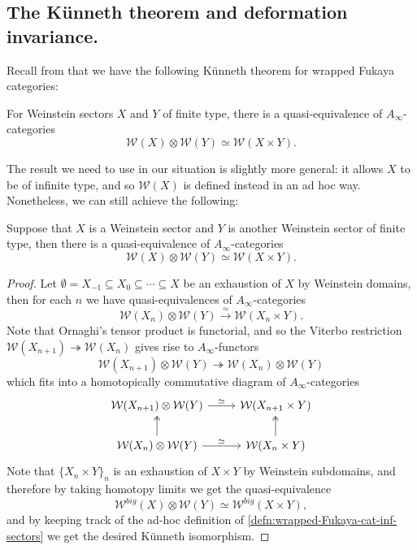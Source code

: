 \subsection{The K\"unneth theorem and deformation invariance.} Recall from \cite{GPS24S} that we have the following K\"unneth theorem for wrapped Fukaya categories:
\begin{thm}\label{thm:Kunneth-theorem-Fukaya-cat}
    For Weinstein sectors $X$ and $Y$ of finite type, there is a quasi-equivalence of $A_{\infty}$-categories \[
        \mathcal{W} (X)\otimes\mathcal{W} (Y)\simeq\mathcal{W} (X\times Y).
    \]
\end{thm}
The result we need to use in our situation is slightly more general: it allows $X$ to be of infinite type, and so $\mathcal{W} (X)$ is defined instead in an ad hoc way. Nonetheless, we can still achieve the following:
\begin{crl}\label{crl:Kunneth-Fukaya-infinite}
    Suppose that $X$ is a Weinstein sector and $Y$ is another Weinstein sector of finite type, then there is a quasi-equivalence of $A_{\infty}$-categories \[
        \mathcal{W} (X)\otimes\mathcal{W} (Y)\simeq\mathcal{W} (X\times Y).
    \]
\end{crl}
\begin{proof}
    Let $\emptyset=X_{-1}\subseteq X_0\subseteq\dotsb\subseteq X$ be an exhaustion of $X$ by Weinstein domains, then for each $n$ we have quasi-equivalences of $A_{\infty}$-categories \[
        \mathcal{W} (X_n)\otimes\mathcal{W} (Y)\xrightarrow{\simeq}\mathcal{W} (X_n\times Y).
    \]Note that Ornaghi's tensor product \cite{Ornaghi25} is functorial, and so the Viterbo restriction $\mathcal{W} (X_{n+1})\twoheadrightarrow\mathcal{W} (X_n)$ gives rise to $A_{\infty}$-functors \[
        \mathcal{W} (X_{n+1})\otimes\mathcal{W} (Y)\twoheadrightarrow\mathcal{W} (X_n)\otimes\mathcal{W} (Y)
    \]which fits into a homotopically commutative diagram of $A_{\infty}$-categories \[
        \begin{tikzcd}
            \mathcal{W} (X_{n+1})\otimes \mathcal{W} (Y)\arrow[r,"\simeq"]&\mathcal{W} (X_{n+1}\times Y)\\ 
            \mathcal{W} (X_n)\otimes\mathcal{W} (Y)\arrow[u,two heads]\arrow[r,"\simeq"]&\mathcal{W} (X_n\times Y)\arrow[u,two heads]
        \end{tikzcd}
    \]Note that $\{X_n\times Y\}_n$ is an exhaustion of $X\times Y$ by Weinstein subdomains, and therefore by taking homotopy limits we get the quasi-equivalence \[
        \mathcal{W}^{big} (X)\otimes\mathcal{W}(Y)\simeq\mathcal{W}^{big} (X\times Y),
    \]and by keeping track of the ad-hoc definition of \ref{defn:wrapped-Fukaya-cat-inf-sectors} we get the desired K\"unneth isomorphism.
\end{proof}
